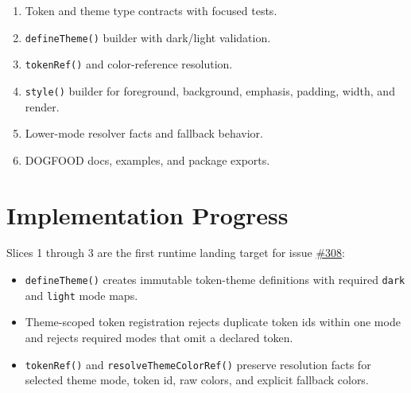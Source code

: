 \begin{enumerate}
\def\labelenumi{\arabic{enumi}.}
\tightlist
\item
  Token and theme type contracts with focused tests.
\item
  \texttt{d\allowbreak{}e\allowbreak{}f\allowbreak{}i\allowbreak{}n\allowbreak{}e\allowbreak{}T\allowbreak{}h\allowbreak{}e\allowbreak{}m\allowbreak{}e\allowbreak{}(\allowbreak{})} builder with dark/light validation.
\item
  \texttt{t\allowbreak{}o\allowbreak{}k\allowbreak{}e\allowbreak{}n\allowbreak{}R\allowbreak{}e\allowbreak{}f\allowbreak{}(\allowbreak{})} and color-reference resolution.
\item
  \texttt{s\allowbreak{}t\allowbreak{}y\allowbreak{}l\allowbreak{}e\allowbreak{}(\allowbreak{})} builder for foreground, background, emphasis, padding, width, and render.
\item
  Lower-mode resolver facts and fallback behavior.
\item
  DOGFOOD docs, examples, and package exports.
\end{enumerate}

\section{Implementation Progress}\label{record-178-implementation-progress}

Slices 1 through 3 are the first runtime landing target for issue \href{https://github.com/flyingrobots/bijou/issues/308}{\#308}:

\begin{itemize}
\tightlist
\item
  \texttt{d\allowbreak{}e\allowbreak{}f\allowbreak{}i\allowbreak{}n\allowbreak{}e\allowbreak{}T\allowbreak{}h\allowbreak{}e\allowbreak{}m\allowbreak{}e\allowbreak{}(\allowbreak{})} creates immutable token-theme definitions with required \texttt{d\allowbreak{}a\allowbreak{}r\allowbreak{}k} and \texttt{l\allowbreak{}i\allowbreak{}g\allowbreak{}h\allowbreak{}t} mode maps.
\item
  Theme-scoped token registration rejects duplicate token ids within one mode and rejects required modes that omit a declared token.
\item
  \texttt{t\allowbreak{}o\allowbreak{}k\allowbreak{}e\allowbreak{}n\allowbreak{}R\allowbreak{}e\allowbreak{}f\allowbreak{}(\allowbreak{})} and \texttt{r\allowbreak{}e\allowbreak{}s\allowbreak{}o\allowbreak{}l\allowbreak{}v\allowbreak{}e\allowbreak{}T\allowbreak{}h\allowbreak{}e\allowbreak{}m\allowbreak{}e\allowbreak{}C\allowbreak{}o\allowbreak{}l\allowbreak{}o\allowbreak{}r\allowbreak{}R\allowbreak{}e\allowbreak{}f\allowbreak{}(\allowbreak{})} preserve resolution facts for selected theme mode, token id, raw colors, and explicit fallback colors.
\end{itemize}

